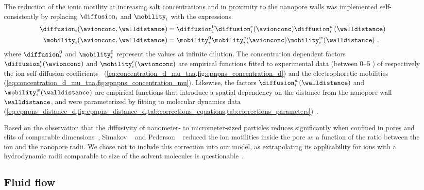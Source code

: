 The reduction of the ionic motility at increasing salt concentrations and in proximity to the nanopore walls
was implemented self-consistently by replacing $\diffusion_{i}$ and $\mobility_{i}$ with the expressions
%
\begin{align}\label{eq:epnp-ns_diffusion_and_mobility}
  \diffusion_{i}(\avionconc,\walldistance) ={}&
      \diffusion_{i}^0 \diffusion_{i}^c(\avionconc) \diffusion_{i}^w(\walldistance)  \\
  \mobility_{i}(\avionconc,\walldistance) ={}&
      \mobility_{i}^0 \mobility_{i}^c(\avionconc) \mobility_{i}^w(\walldistance)
  \text{ ,}
\end{align}
%
where $\diffusion_{i}^0$ and $\mobility_{i}^0$ represent the values at infinite dilution. The concentration
dependent factors $\diffusion_{i}^c(\avionconc)$ and $\mobility_{i}^c(\avionconc)$ are empirical functions
fitted to experimental data (between \SIrange{0}{5}{\Molar} ) of respectively the ion self-diffusion
coefficients~\cite{Mills-1989} (\cref{eq:concentration_d_mu_tna,fig:epnpns_concentration_d}) and the
electrophoretic mobilities~\cite{Bianchi-1989,Currie-1960,Goldsack-1976,DellaMonica-1979}
(\cref{eq:concentration_d_mu_tna,fig:epnpns_concentration_mu}). Likewise, the factors
$\diffusion_{i}^w(\walldistance)$ and $\mobility_{i}^w(\walldistance)$ are empirical functions that introduce
a spatial dependency on the distance from the nanopore wall $\walldistance$, and were parameterized by fitting
to molecular dynamics data
(\cref{eq:epnpns_distance_d,fig:epnpns_distance_d,tab:corrections_equations,tab:corrections_parameters})~\cite{Noskov-2004,Simakov-2010,Makarov-1998,Wilson-2019}.

Based on the observation that the diffusivity of nanometer- to micrometer-sized particles reduces
significantly when confined in pores and slits of comparable dimensions~\cite{Renkin-1954,Deen-1987,
Dechadilok-2006,Muthukumar-2014,Kannam-2017}, Simakov \etal{}~\cite{Simakov-2010} and Pederson
\etal{}~\cite{Pederson-2015} reduced the ion motilities inside the pore as a function of the ratio between the
ion and the nanopore radii. We chose not to include this correction into our model, as extrapolating its
applicability for ions with a hydrodynamic radii comparable to size of the solvent molecules is
questionable~\cite{Anderson-1972,Deen-1987}.


\subsection{Fluid flow}
%

